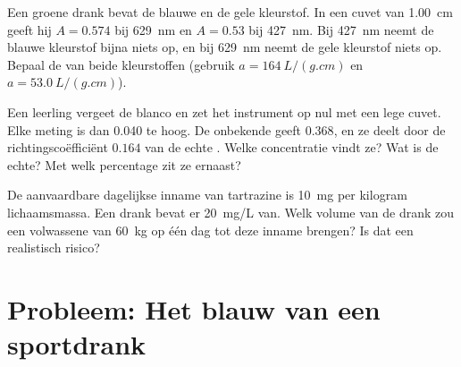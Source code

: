 \begin{exercise}[$\star\star\star$]\label{exo:g11:absorbance:13}
Een groene drank bevat de blauwe en de gele kleurstof. In een cuvet van
\qty{1.00}{cm} geeft hij $A = 0.574$ bij \qty{629}{nm} en $A = 0.53$
bij \qty{427}{nm}. Bij \qty{427}{nm} neemt de blauwe kleurstof bijna niets
op, en bij \qty{629}{nm} neemt de gele kleurstof niets op. Bepaal de
 van beide kleurstoffen (gebruik
$a = \qty{164}{L/(g.cm)}$ en $a = \qty{53.0}{L/(g.cm)}$).
\end{exercise}

\begin{exercise}[$\star\star\star$]\label{exo:g11:absorbance:14}
Een leerling vergeet de blanco en zet het instrument op nul met een lege
cuvet. Elke meting is dan \num{0.040} te hoog. De onbekende geeft
$0.368$, en ze deelt door de richtingscoëfficiënt $0.164$ van de echte
. Welke concentratie vindt ze? Wat is de echte? Met welk
percentage zit ze ernaast?
\end{exercise}

\begin{exercise}[$\star\star\star$]\label{exo:g11:absorbance:15}
De aanvaardbare dagelijkse inname van tartrazine is \qty{10}{mg} per
kilogram lichaamsmassa. Een drank bevat er \qty{20}{mg/L} van. Welk volume
van de drank zou een volwassene van \qty{60}{kg} op één dag tot deze
inname brengen? Is dat een realistisch risico?
\end{exercise}

\section{Probleem: Het blauw van een sportdrank}


